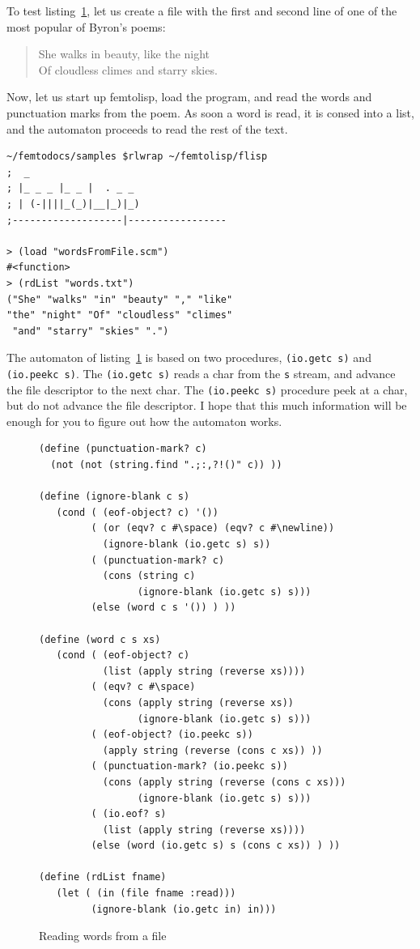 \documentclass[a4paper,12pt]{book}
\begin{document}
To test listing~\ref{wordsFromFile}, let
us create a file with the first and
second line of one of the most
popular of Byron's poems:
\begin{quote}
She walks in beauty, like the night\\ 
Of cloudless climes and starry skies.
\end{quote}
Now, let us start up femtolisp, load
the program, and read the words and
punctuation marks from the poem.
As soon a word is read, it is consed
into a list, and the automaton proceeds
to read the rest of the text.
\begin{verbatim}
~/femtodocs/samples $rlwrap ~/femtolisp/flisp
;  _
; |_ _ _ |_ _ |  . _ _
; | (-||||_(_)|__|_)|_)
;-------------------|-----------------

> (load "wordsFromFile.scm")
#<function>
> (rdList "words.txt")
("She" "walks" "in" "beauty" "," "like" 
"the" "night" "Of" "cloudless" "climes"
 "and" "starry" "skies" ".")
\end{verbatim}


The automaton of listing~\ref{wordsFromFile} 
is based on two procedures, \verb|(io.getc s)| and
\verb|(io.peekc s)|. The \verb|(io.getc s)|
reads a char from the \verb|s| stream,
and advance the file descriptor to the
next char. The \verb|(io.peekc s)| procedure
peek at a char, but do not advance the
file descriptor. I hope that this much
information will be enough for you to 
figure out how the automaton works.

\begin{figure}[!b]
\begin{verbatim}
(define (punctuation-mark? c)
  (not (not (string.find ".;:,?!()" c)) ))

(define (ignore-blank c s)
   (cond ( (eof-object? c) '())
         ( (or (eqv? c #\space) (eqv? c #\newline)) 
           (ignore-blank (io.getc s) s))
         ( (punctuation-mark? c)
           (cons (string c) 
                 (ignore-blank (io.getc s) s)))
         (else (word c s '()) ) )) 

(define (word c s xs)
   (cond ( (eof-object? c)
           (list (apply string (reverse xs))))
         ( (eqv? c #\space)
           (cons (apply string (reverse xs))
                 (ignore-blank (io.getc s) s)))
         ( (eof-object? (io.peekc s))
           (apply string (reverse (cons c xs)) ))
         ( (punctuation-mark? (io.peekc s))
           (cons (apply string (reverse (cons c xs)))
                 (ignore-blank (io.getc s) s)))
         ( (io.eof? s)
           (list (apply string (reverse xs))))
         (else (word (io.getc s) s (cons c xs)) ) ))

(define (rdList fname)
   (let ( (in (file fname :read)))
         (ignore-blank (io.getc in) in)))
\end{verbatim}
\caption{Reading words from a file}
\label{wordsFromFile}
\end{figure}
\end{document}
